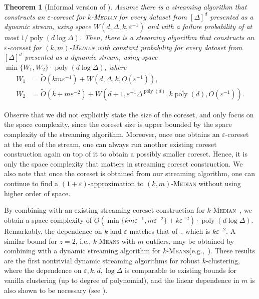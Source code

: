 \documentclass[letterpaper,11pt]{article}
\theoremstyle{plain}
\newtheorem{theorem}{Theorem}[section]
\theoremstyle{definition}
\theoremstyle{remark}
\DeclareMathOperator{\poly}{poly}
\newcommand{\eps}{\varepsilon}
\renewcommand{\epsilon}{\varepsilon}
\newcommand{\ProblemName}[1]{\textsc{#1}}
\newcommand{\kMedian}{\ProblemName{$k$-Median}\xspace}
\newcommand{\kMeans}{\ProblemName{$k$-Means}\xspace}
\newcommand{\kRMedian}{\ProblemName{$(k,m)$-Median}\xspace}
\begin{document}
\begin{theorem}[Informal version of ]
    \label{thm:intro_streaming}
    Assume there is a streaming algorithm that constructs an $\eps$-coreset for \kMedian for every dataset from $[\Delta]^d$ presented as a dynamic stream, using space $W(d, \Delta, k,\epsilon^{-1})$ and with a failure probability of at most $1/\poly(d\log\Delta)$. 
Then, there is a streaming algorithm that constructs an $\eps$-coreset for \kRMedian with constant probability for every dataset from $[\Delta]^d$ presented as a dynamic stream,
    using space $\min\{W_1, W_2\}\cdot \poly(d\log\Delta)$, where 
    \begin{align*}
        W_1&= \tilde O(km\eps^{-1}) + W\left(d,\Delta, k, O(\eps^{-1})\right),\\
        W_2&= \tilde O(k+m\eps^{-2}) + W\left(d+ 1, \eps^{-1} \Delta^{\poly(d)}, k\poly(d), O(\eps^{-1})\right).
    \end{align*}
\end{theorem}

Observe that we did not explicitly state the size of the coreset, and only focus on the space complexity,
since the coreset size is upper bounded by the space complexity of the streaming algorithm.
Moreover, once one obtains an $\eps$-coreset at the end of the stream, one can always run another existing coreset construction again on top of it to obtain a possibly smaller coreset.
Hence, it is only the space complexity that matters in streaming coreset construction.
We also note that once the coreset is obtained from our streaming algorithm,
one can continue to find a $(1 + \epsilon)$-approximation to \kRMedian without using higher order of space.

By combining  with an existing streaming coreset construction for \kMedian~\cite{Braverman2017Clustering}, we obtain a space complexity of $\tilde O\left(\min\{km\eps^{-1}, m\eps^{-2}\} + k\eps^{-2}\right)\cdot \poly(d\log\Delta)$.
Remarkably, the dependence on $k$ and $\eps$ matches that of~\cite{Braverman2017Clustering}, which is $k\eps^{-2}$.
A similar bound for $z = 2$, i.e., \kMeans with $m$ outliers, may be obtained by combining with a dynamic streaming algorithm for \kMeans (e.g.,~\cite{Song2018Nearly}).
These results are the first nontrivial dynamic streaming algorithms for robust $k$-clustering,
where the dependence on $\epsilon, k, d, \log \Delta$ is comparable to existing bounds for vanilla clustering (up to degree of polynomial),
and the linear dependence in $m$ is also shown to be necessary (see ).
\end{document}
